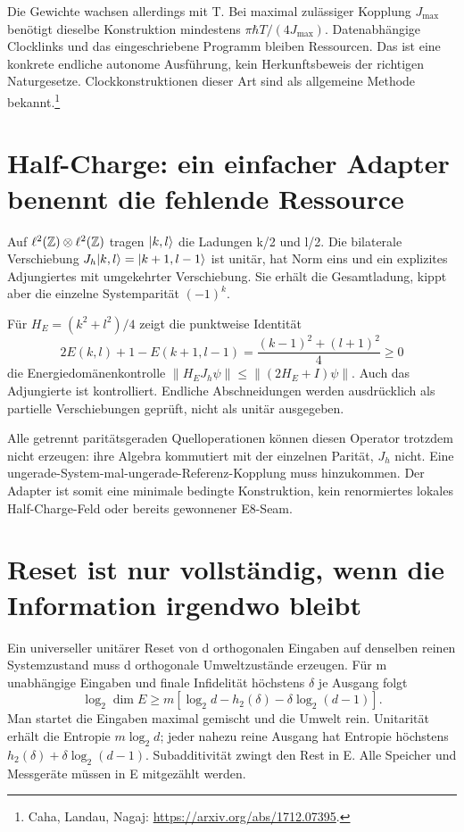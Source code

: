 Die Gewichte wachsen allerdings mit T. Bei maximal zulässiger Kopplung $J_{\max}$ benötigt dieselbe Konstruktion mindestens $\pi\hbar T/(4J_{\max})$. Datenabhängige Clocklinks und das eingeschriebene Programm bleiben Ressourcen. Das ist eine konkrete endliche autonome Ausführung, kein Herkunftsbeweis der richtigen Naturgesetze. Clockkonstruktionen dieser Art sind als allgemeine Methode bekannt.\footnote{Caha, Landau, Nagaj: \url{https://arxiv.org/abs/1712.07395}.}

\section{Half-Charge: ein einfacher Adapter benennt die fehlende Ressource}
Auf $\ell^2(\mathbb Z)\otimes\ell^2(\mathbb Z)$ tragen $\lvert k,l\rangle$ die Ladungen k/2 und l/2. Die bilaterale Verschiebung $J_h\lvert k,l\rangle=\lvert k+1,l-1\rangle$ ist unitär, hat Norm eins und ein explizites Adjungiertes mit umgekehrter Verschiebung. Sie erhält die Gesamtladung, kippt aber die einzelne Systemparität $(-1)^k$.

Für $H_E=(k^2+l^2)/4$ zeigt die punktweise Identität
\[
2E(k,l)+1-E(k+1,l-1)=\frac{(k-1)^2+(l+1)^2}4\ge0
\]
die Energiedomänenkontrolle $\|H_EJ_h\psi\|\le\|(2H_E+I)\psi\|$. Auch das Adjungierte ist kontrolliert. Endliche Abschneidungen werden ausdrücklich als partielle Verschiebungen geprüft, nicht als unitär ausgegeben.

Alle getrennt paritätsgeraden Quelloperationen können diesen Operator trotzdem nicht erzeugen: ihre Algebra kommutiert mit der einzelnen Parität, $J_h$ nicht. Eine ungerade-System-mal-ungerade-Referenz-Kopplung muss hinzukommen. Der Adapter ist somit eine minimale bedingte Konstruktion, kein renormiertes lokales Half-Charge-Feld oder bereits gewonnener E8-Seam.

\section{Reset ist nur vollständig, wenn die Information irgendwo bleibt}
Ein universeller unitärer Reset von d orthogonalen Eingaben auf denselben reinen Systemzustand muss d orthogonale Umweltzustände erzeugen. Für m unabhängige Eingaben und finale Infidelität höchstens $\delta$ je Ausgang folgt
\[
\log_2\dim E\ge m[\log_2d-h_2(\delta)-\delta\log_2(d-1)].
\]
Man startet die Eingaben maximal gemischt und die Umwelt rein. Unitarität erhält die Entropie $m\log_2d$; jeder nahezu reine Ausgang hat Entropie höchstens $h_2(\delta)+\delta\log_2(d-1)$. Subadditivität zwingt den Rest in E. Alle Speicher und Messgeräte müssen in E mitgezählt werden.

